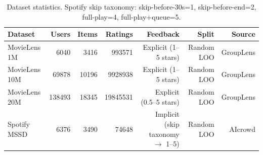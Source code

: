 \begin{table}[ht]
\centering
\caption{Dataset statistics. Spotify skip taxonomy: skip-before-30s=1, skip-before-end=2, full-play=4, full-play+queue=5.}
\begin{tabular}{lrrrrrr}
\toprule
Dataset & Users & Items & Ratings & Feedback & Split & Source \\
\midrule
MovieLens 1M & 6040 & 3416 & 993571 & Explicit (1–5 stars) & Random LOO & GroupLens \\
MovieLens 10M & 69878 & 10196 & 9928938 & Explicit (1–5 stars) & Random LOO & GroupLens \\
MovieLens 20M & 138493 & 18345 & 19845531 & Explicit (0.5–5 stars) & Random LOO & GroupLens \\
Spotify MSSD & 6376 & 3490 & 74648 & Implicit (skip taxonomy $\to$ 1–5) & Random LOO & AIcrowd \\
\bottomrule
\end{tabular}
\end{table}